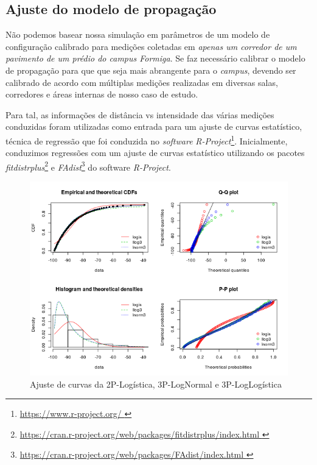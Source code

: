 \documentclass[
	12pt,				%
	openright,			%
	twoside,			%
	a4paper,			%
	english,			%
	french,				%
	spanish,			%
	brazil				%
	]{abntex2}
\begin{document}
\subsection[Ajuste do modelo de propagação]{Ajuste do modelo de propagação}

Não podemos basear nossa simulação em parâmetros de um modelo de configuração calibrado para medições coletadas em \textit{apenas um corredor de um pavimento de um prédio do campus Formiga}. Se faz necessário calibrar o modelo de propagação para que que seja mais abrangente para o \textit{campus}, devendo ser calibrado de acordo com múltiplas medições realizadas em diversas salas, corredores e áreas internas de nosso caso de estudo.

Para tal, as informações de distância vs intensidade das várias medições conduzidas foram utilizadas como entrada para um ajuste de curvas estatístico, técnica de regressão que foi conduzida no \textit{software} \textit{R-Project}\footnote{\url{https://www.r-project.org/ }}. Inicialmente, conduzimos regressões com um ajuste de curvas estatístico utilizando os pacotes \textit{fitdistrplus}\footnote{\url{https://cran.r-project.org/web/packages/fitdistrplus/index.html }} e \textit{FAdist}\footnote{\url{https://cran.r-project.org/web/packages/FAdist/index.html }} do software \textit{R-Project}.

\begin{figure}[htb]
	\caption{\label{curvas} Ajuste de curvas da 2P-Logística, 3P-LogNormal e 3P-LogLogística}
	\begin{center}
		\includegraphics[scale=0.8]{images/curvas.jpg}
	\end{center}
\end{figure}
\end{document}
